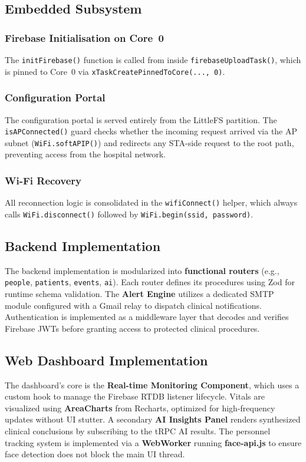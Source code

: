 \subsection{Embedded Subsystem}

\subsubsection{Firebase Initialisation on Core~0}

The \texttt{initFirebase()} function is called from inside
\texttt{firebaseUploadTask()}, which is pinned to Core~0 via
\texttt{xTaskCreatePinnedToCore(..., 0)}.

\subsubsection{Configuration Portal}

The configuration portal is served entirely from the LittleFS partition.
The \texttt{isAPConnected()} guard checks whether the incoming request arrived via
the AP subnet (\texttt{WiFi.softAPIP()}) and redirects any STA-side request to the
root path, preventing access from the hospital network.

\subsubsection{Wi-Fi Recovery}

All reconnection logic is consolidated in the \texttt{wifiConnect()} helper, which
always calls \texttt{WiFi.disconnect()} followed by
\texttt{WiFi.begin(ssid, password)}.

\subsection{Backend Implementation}
The backend implementation is modularized into \textbf{functional routers} (e.g., \texttt{people}, \texttt{patients}, \texttt{events}, \texttt{ai}). Each router defines its procedures using Zod for runtime schema validation. The \textbf{Alert Engine} utilizes a dedicated SMTP module configured with a Gmail relay to dispatch clinical notifications. Authentication is implemented as a middleware layer that decodes and verifies Firebase JWTs before granting access to protected clinical procedures.

\subsection{Web Dashboard Implementation}
The dashboard's core is the \textbf{Real-time Monitoring Component}, which uses a custom hook to manage the Firebase RTDB listener lifecycle. Vitals are visualized using \textbf{AreaCharts} from Recharts, optimized for high-frequency updates without UI stutter. A secondary \textbf{AI Insights Panel} renders synthesized clinical conclusions by subscribing to the tRPC AI results. The personnel tracking system is implemented via a \textbf{WebWorker} running \textbf{face-api.js} to ensure face detection does not block the main UI thread.

